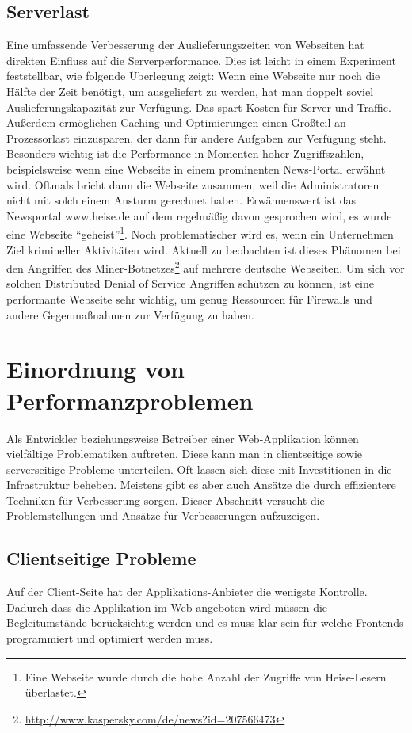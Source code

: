 \subsection{Serverlast}
Eine umfassende Verbesserung der Auslieferungszeiten von Webseiten hat direkten Einfluss auf die Serverperformance. Dies ist leicht in einem Experiment feststellbar, wie folgende Überlegung zeigt: Wenn eine Webseite nur noch die Hälfte der Zeit benötigt, um ausgeliefert zu werden, hat man doppelt soviel Auslieferungskapazität zur Verfügung. Das spart Kosten für Server und Traffic. Außerdem ermöglichen Caching und Optimierungen einen Großteil an Prozessorlast einzusparen, der dann für andere Aufgaben zur Verfügung steht. Besonders wichtig ist die Performance in Momenten hoher Zugriffszahlen, beispielsweise wenn eine Webseite in einem prominenten News-Portal erwähnt wird. Oftmals bricht dann die Webseite zusammen, weil die Administratoren nicht mit solch einem Ansturm gerechnet haben. Erwähnenswert ist das Newsportal www.heise.de auf dem regelmäßig davon gesprochen wird, es wurde eine Webseite "`geheist"'\footnote{Eine Webseite wurde durch die hohe Anzahl der Zugriffe von Heise-Lesern \"uberlastet.}. Noch problematischer wird es, wenn ein Unternehmen Ziel krimineller Aktivitäten wird. Aktuell zu beobachten ist dieses Phänomen bei den Angriffen des Miner-Botnetzes\footnote{\url{http://www.kaspersky.com/de/news?id=207566473}} auf mehrere deutsche Webseiten. Um sich vor solchen Distributed Denial of Service Angriffen schützen zu können, ist eine performante Webseite sehr wichtig, um genug Ressourcen für Firewalls und andere Gegenmaßnahmen zur Verfügung zu haben.

\section{Einordnung von Performanzproblemen}
Als Entwickler beziehungsweise Betreiber einer Web-Applikation k\"onnen vielf\"altige Problematiken auftreten. Diese kann man in clientseitige sowie serverseitige Probleme unterteilen. Oft lassen sich diese mit Investitionen in die Infrastruktur beheben. Meistens gibt es aber auch Ans\"atze die durch effizientere Techniken f\"ur Verbesserung sorgen. Dieser Abschnitt versucht die Problemstellungen und Ans\"atze f\"ur Verbesserungen aufzuzeigen.
\subsection{Clientseitige Probleme}
Auf der Client-Seite hat der Applikations-Anbieter die wenigste Kontrolle. Dadurch dass die Applikation im Web angeboten wird m\"ussen die Begleitumst\"ande ber\"ucksichtig werden und es muss klar sein f\"ur welche Frontends programmiert und optimiert werden muss.  
